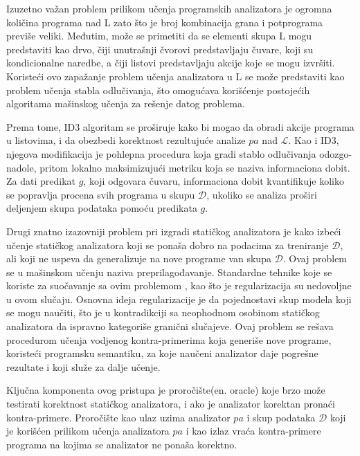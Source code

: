 \documentclass[a4paper]{article}
\theoremstyle{definition}
\begin{document}
{%
Izuzetno važan problem prilikom učenja programskih analizatora je ogromna količina 
programa nad L zato što je broj kombinacija grana i potprograma previše veliki. 
Međutim, može se primetiti da se elementi skupa L mogu predstaviti kao drvo, čiji 
unutrašnji čvorovi predstavljaju čuvare, koji su kondicionalne naredbe, a čiji 
listovi predstavljaju akcije koje se mogu izvršiti. Koristeći ovo zapažanje problem 
učenja analizatora u L se može predstaviti kao problem učenja stabla odlučivanja, 
što omogućava korišćenje postojećih algoritama mašinskog učenja za 
rešenje datog problema.

Prema tome, ID3 \cite{id3} algoritam se proširuje kako bi mogao da obradi akcije 
programa u listovima, i da obezbedi korektnost rezultujuće analize $pa$ nad 
$\mathcal{L}$. Kao i ID3, njegova modifikacija je pohlepna procedura koja gradi 
stablo odlučivanja odozgo-nadole, pritom lokalno maksimizujući metriku koja se 
naziva informaciona dobit. Za dati predikat $g$, koji odgovara čuvaru, 
informaciona dobit kvantifikuje koliko se popravlja procena svih programa u 
skupu $\mathcal{D}$, ukoliko se analiza proširi deljenjem skupa podataka 
pomoću predikata $g$.


Drugi znatno izazovniji problem pri izgradi statičkog analizatora je 
kako izbeći učenje statičkog analizatora koji se ponaša dobro 
na podacima za treniranje $\mathcal{D}$, ali koji ne uspeva da 
generalizuje na nove programe van skupa $\mathcal{D}$. Ovaj problem se u mašinskom 
učenju naziva preprilagođavanje. Standardne tehnike koje se koriste za suočavanje 
sa ovim problemom \cite{statisticalLearningTheory}, kao što je regularizacija su 
nedovoljne u ovom slučaju. Osnovna ideja regularizacije je da pojednostavi skup 
modela koji se mogu naučiti, što je u kontradikciji sa neophodnom osobinom 
statičkog analizatora da ispravno kategoriše granični slučajeve. Ovaj problem 
se rešava procedurom učenja vodjenog kontra-primerima koja generiše nove 
programe, koristeći programsku semantiku, za koje naučeni analizator daje 
pogrešne rezultate i koji služe za dalje učenje. 


Ključna komponenta ovog pristupa je proročište(en. oracle) koje brzo može 
testirati korektnost statičkog analizatora, i ako je analizator korektan 
pronaći kontra-primere. Proročište kao ulaz uzima analizator $pa$ i skup 
podataka $\mathcal{D}$ koji je korišćen prilikom učenja analizatora $pa$ 
i kao izlaz vraća kontra-primere programa na kojima se analizator ne 
ponaša korektno.

}
\end{document}
